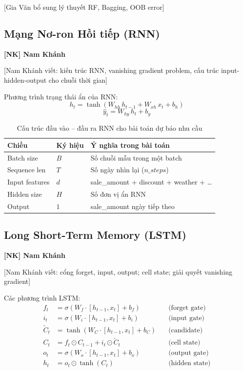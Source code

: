 \documentclass[12pt,a4paper]{report}
\newcommand{\ownerNK}{\colorbox{blue!15}{\textbf{[NK] Nam Khánh}}}
\begin{document}
[Gia Văn bổ sung lý thuyết RF, Bagging, OOB error]


\subsection{Mạng Nơ-ron Hồi tiếp (RNN)}
\ownerNK

[Nam Khánh viết: kiến trúc RNN, vanishing gradient problem, cấu trúc input-hidden-output cho chuỗi thời gian]

Phương trình trạng thái ẩn của RNN:
\[
h_t = \tanh(W_{hh}\,h_{t-1} + W_{xh}\,x_t + b_h)
\]
\[
\hat{y}_t = W_{hy}\,h_t + b_y
\]

\begin{table}[H]
\centering
\caption{Cấu trúc đầu vào -- đầu ra RNN cho bài toán dự báo nhu cầu}
\begin{tabular}{lll}
\toprule
\textbf{Chiều} & \textbf{Ký hiệu} & \textbf{Ý nghĩa trong bài toán} \\
\midrule
Batch size     & $B$   & Số chuỗi mẫu trong một batch \\
Sequence len   & $T$   & Số ngày nhìn lại ($n\_steps$) \\
Input features & $d$   & sale\_amount + discount + weather + \ldots \\
Hidden size    & $H$   & Số đơn vị ẩn RNN \\
Output         & $1$   & sale\_amount ngày tiếp theo \\
\bottomrule
\end{tabular}
\end{table}

\subsection{Long Short-Term Memory (LSTM)}
\ownerNK

[Nam Khánh viết: cổng forget, input, output; cell state; giải quyết vanishing gradient]

Các phương trình LSTM:
\begin{align}
f_t &= \sigma(W_f \cdot [h_{t-1}, x_t] + b_f) \quad &\text{(forget gate)} \\
i_t &= \sigma(W_i \cdot [h_{t-1}, x_t] + b_i) \quad &\text{(input gate)} \\
\tilde{C}_t &= \tanh(W_C \cdot [h_{t-1}, x_t] + b_C) \quad &\text{(candidate)} \\
C_t &= f_t \odot C_{t-1} + i_t \odot \tilde{C}_t \quad &\text{(cell state)} \\
o_t &= \sigma(W_o \cdot [h_{t-1}, x_t] + b_o) \quad &\text{(output gate)} \\
h_t &= o_t \odot \tanh(C_t) \quad &\text{(hidden state)}
\end{align}
\end{document}
